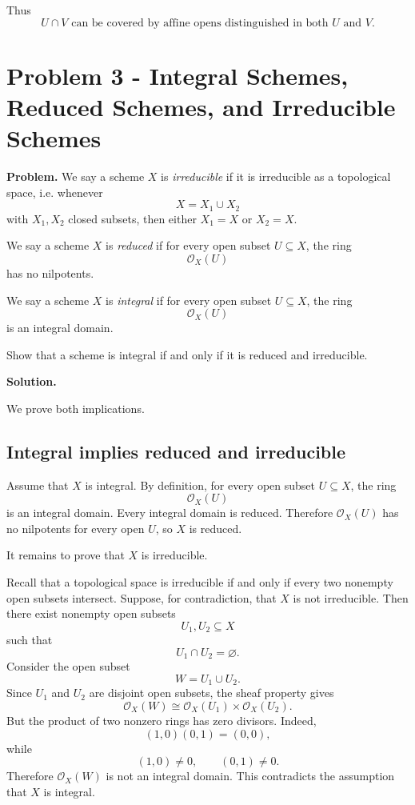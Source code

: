 \documentclass[12pt,a4paper]{article}
\theoremstyle{notespace}
\begin{document}
Thus
\[
\boxed{
	U\cap V
	\text{ can be covered by affine opens distinguished in both }U\text{ and }V.
}
\]


\section{Problem 3 - Integral Schemes, Reduced Schemes, and Irreducible Schemes}

\textbf{Problem.}
We say a scheme \(X\) is \emph{irreducible} if it is irreducible as a topological space, i.e. whenever
\[
X=X_1\cup X_2
\]
with \(X_1,X_2\) closed subsets, then either \(X_1=X\) or \(X_2=X\).

We say a scheme \(X\) is \emph{reduced} if for every open subset \(U\subseteq X\), the ring
\[
\mathcal O_X(U)
\]
has no nilpotents.

We say a scheme \(X\) is \emph{integral} if for every open subset \(U\subseteq X\), the ring
\[
\mathcal O_X(U)
\]
is an integral domain.

Show that a scheme is integral if and only if it is reduced and irreducible.

\textbf{Solution.}

We prove both implications.

\subsection*{Integral implies reduced and irreducible}

Assume that \(X\) is integral. By definition, for every open subset \(U\subseteq X\), the ring
\[
\mathcal O_X(U)
\]
is an integral domain. Every integral domain is reduced. Therefore \(\mathcal O_X(U)\) has no nilpotents for every open \(U\), so \(X\) is reduced.

It remains to prove that \(X\) is irreducible.

Recall that a topological space is irreducible if and only if every two nonempty open subsets intersect. Suppose, for contradiction, that \(X\) is not irreducible. Then there exist nonempty open subsets
\[
U_1,U_2\subseteq X
\]
such that
\[
U_1\cap U_2=\varnothing.
\]
Consider the open subset
\[
W=U_1\cup U_2.
\]
Since \(U_1\) and \(U_2\) are disjoint open subsets, the sheaf property gives
\[
\mathcal O_X(W)
\cong
\mathcal O_X(U_1)\times \mathcal O_X(U_2).
\]
But the product of two nonzero rings has zero divisors. Indeed,
\[
(1,0)(0,1)=(0,0),
\]
while
\[
(1,0)\neq 0,
\qquad
(0,1)\neq 0.
\]
Therefore \(\mathcal O_X(W)\) is not an integral domain. This contradicts the assumption that \(X\) is integral.
\end{document}
